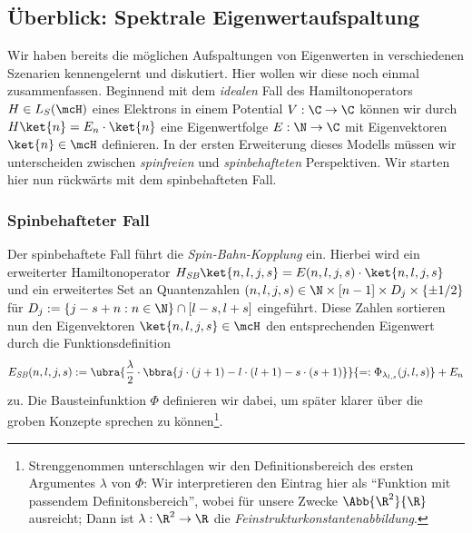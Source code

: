 \documentclass{subfiles}
\begin{document}
    \subsection{Überblick: Spektrale Eigenwertaufspaltung}\label{Ub:SpektralAufspaltung}
        Wir haben bereits die möglichen Aufspaltungen von Eigenwerten in verschiedenen Szenarien kennengelernt und diskutiert. Hier wollen wir diese noch einmal zusammenfassen. Beginnend mit dem \emph{idealen} Fall des Hamiltonoperators $H\in L_S(\mcH)$ eines Elektrons in einem Potential $V:\C\to\C$ können wir durch $H\ket{n} = E_n\cdot\ket{n}$ eine Eigenwertfolge $E:\N\to\C$ mit Eigenvektoren $\ket{n}\in\mcH$ definieren. In der ersten Erweiterung dieses Modells müssen wir unterscheiden zwischen \emph{spinfreien} und \emph{spinbehafteten} Perspektiven. Wir starten hier nun rückwärts mit dem spinbehafteten Fall. 

        \subsubsection*{Spinbehafteter Fall}
            Der spinbehaftete Fall führt die \emph{Spin-Bahn-Kopplung} ein. Hierbei wird ein erweiterter Hamiltonoperator $H_\textit{SB}\ket{n,l,j,s} = E(n,l,j,s)\cdot\ket{n,l,j,s}$ und ein erweitertes Set an Quantenzahlen $(n,l,j,s)\in\N\times[n-1]\times D_j\times\{\pm 1/2\}$ für $D_j:=\{j-s+n:n\in\N\}\cap[l-s,l+s]$ eingeführt. Diese Zahlen sortieren nun den Eigenvektoren $\ket{n,l,j,s}\in\mcH$ den entsprechenden Eigenwert durch die Funktionsdefinition
            \[
                E_\textit{SB}(n,l,j,s) := \ubra{\frac{\lambda}{2}\cdot\bbra{j\cdot(j+1) - l\cdot(l+1) - s\cdot(s+1)}}{=:\Phi_{\lambda_{l,s}}(j,l,s)} + E_n
            \] 
            zu. Die Bausteinfunktion $\Phi$ definieren wir dabei, um später klarer über die groben Konzepte sprechen zu können\footnote{Strenggenommen unterschlagen wir den Definitionsbereich des ersten Argumentes $\lambda$ von $\Phi$: Wir interpretieren den Eintrag hier als \enquote{Funktion mit passendem Definitonsbereich}, wobei für unsere Zwecke $\Abb{\R^2}{\R}$ ausreicht; Dann ist $\lambda:\R^2\to\R$ die \emph{Feinstrukturkonstantenabbildung}.}.
\end{document}
